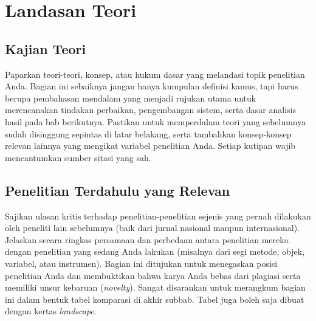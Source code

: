 \chapter{Landasan Teori}


\section{Kajian Teori}

Paparkan teori-teori, konsep, atau hukum dasar yang melandasi topik penelitian Anda. Bagian ini sebaiknya jangan hanya kumpulan definisi kamus, tapi harus berupa pembahasan mendalam yang menjadi rujukan utama untuk merencanakan tindakan perbaikan, pengembangan sistem, serta dasar analisis hasil pada bab berikutnya. Pastikan untuk memperdalam teori yang sebelumnya sudah disinggung sepintas di latar belakang, serta tambahkan konsep-konsep relevan lainnya yang mengikat variabel penelitian Anda. Setiap kutipan wajib mencantumkan sumber sitasi yang sah.



\section{Penelitian Terdahulu yang Relevan}

Sajikan ulasan kritis terhadap penelitian-penelitian sejenis yang pernah dilakukan oleh peneliti lain sebelumnya (baik dari jurnal nasional maupun internasional). Jelaskan secara ringkas persamaan dan perbedaan antara penelitian mereka dengan penelitian yang sedang Anda lakukan (misalnya dari segi metode, objek, variabel, atau instrumen). Bagian ini ditujukan untuk menegaskan posisi penelitian Anda dan membuktikan bahwa karya Anda bebas dari plagiasi serta memiliki unsur kebaruan (\textit{novelty}). Sangat disarankan untuk merangkum bagian ini dalam bentuk tabel komparasi di akhir subbab. Tabel juga boleh saja dibuat dengan kertas \textit{landscape}.



